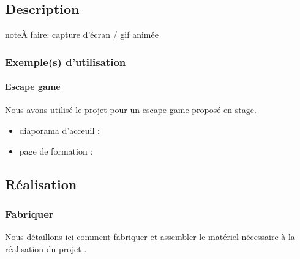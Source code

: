 \documentclass[letterpaper,10pt,french]{sphinxmanual}
\begin{document}
\subsection{Description}
\label{\detokenize{projets/coffre:description}}
\begin{sphinxadmonition}{note}{\label{projets/coffre:index-0}À faire:}
capture d’écran / gif animée
\end{sphinxadmonition}


\subsubsection{Exemple(s) d’utilisation}
\label{\detokenize{projets/coffre:exemple-s-d-utilisation}}

\paragraph{Escape game}
\label{\detokenize{projets/coffre-exemple-escape:escape-game}}\label{\detokenize{projets/coffre-exemple-escape::doc}}
Nous avons utilisé le projet {\hyperref[\detokenize{projets/coffre:projetcoffre}]{}} pour un escape
game proposé en stage.
\begin{itemize}
\item {} 
diaporama d’acceuil : 

\item {} 
page de formation : 

\end{itemize}

\noindent{}


\subsection{Réalisation}
\label{\detokenize{projets/coffre:realisation}}

\subsubsection{Fabriquer}
\label{\detokenize{projets/coffre-fabriquer::doc}}\label{\detokenize{projets/coffre-fabriquer:fabriquer}}
Nous détaillons ici comment fabriquer et assembler
le matériel nécessaire à la réalisation du projet
{\hyperref[\detokenize{projets/coffre:projetcoffre}]{}}.
\end{document}
